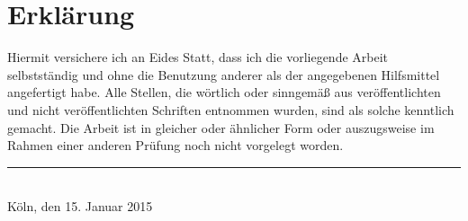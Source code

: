 \section*{Erklärung}

Hiermit versichere ich an Eides Statt, dass ich die vorliegende Arbeit selbstständig und ohne die Benutzung anderer als der angegebenen Hilfsmittel angefertigt habe. 
Alle Stellen, die wörtlich oder sinngemäß aus veröffentlichten und nicht veröffentlichten Schriften entnommen wurden, sind als solche kenntlich gemacht. 
Die Arbeit ist in gleicher oder ähnlicher Form oder auszugsweise im Rahmen einer anderen Prüfung noch nicht vorgelegt worden.

\vspace{20mm}
\begin{flushleft}
    \rule{7cm}{0.4pt}\\
    \vspace{-2mm}
    Köln, den 15. Januar 2015
\end{flushleft}